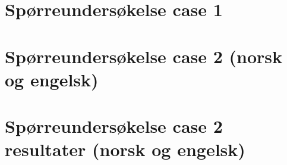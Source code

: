 \chapter{Spørreundersøkelse case 1}
\label{sporreundersokelser}

\label{undersokelse}

\chapter{Spørreundersøkelse case 2 (norsk og engelsk)}

\label{undersokelse_norsk}


\label{undersokelse_engelsk}

\chapter{Spørreundersøkelse case 2 resultater (norsk og engelsk)}

\label{undersokelse_norsk_resultater}


\label{undersokelse_engelsk_resultater}